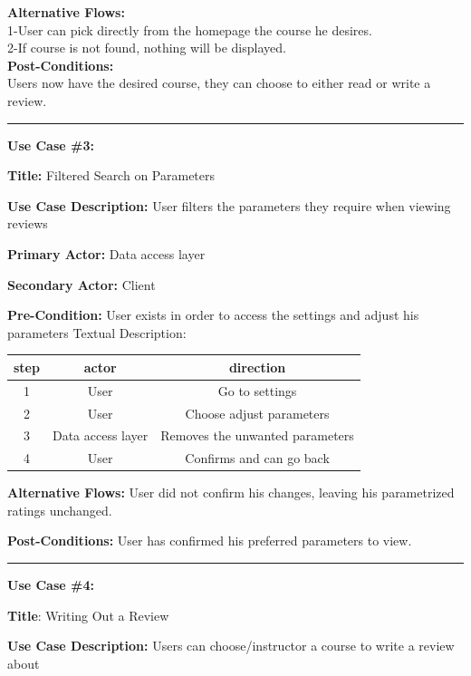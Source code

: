 \documentclass{article}
\begin{document}
\textbf{Alternative Flows:}\\
	1-User can pick directly from the homepage the course he desires.\\
	2-If course is not found, nothing will be displayed.\\
\textbf{Post-Conditions:}\\
	Users now have the desired course, they can choose to either read or write a review.\\

\hrule 


\textbf{Use Case \#3: }

\quad \textbf{Title:} Filtered Search on Parameters

\quad\textbf{Use Case Description:} User filters the parameters they require when viewing reviews

\quad\textbf{Primary Actor:} Data access layer

\quad\textbf{Secondary Actor:} Client

\quad\textbf{Pre-Condition:} User exists in order to access the settings and adjust his parameters
	Textual Description:


\begin{center}
  \begin{tabular}{|c|c|c|} 
    \hline
    step & actor & direction \\  \hline

    1 & 
    User & 
    Go to settings  \\ 
    2 & 
    User & 
Choose adjust parameters \\
    3 & 
    Data access layer &
Removes the unwanted parameters \\
    4 &
    User  &
Confirms and can go back \\
 \hline



  \end{tabular}
\end{center}

\textbf{Alternative Flows:}
	User did not confirm his changes, leaving his parametrized ratings unchanged.

  \textbf{Post-Conditions: }
User has confirmed his preferred parameters to view. \\

\hrule 


\textbf{Use Case \#4: }

\quad\textbf{Title}: Writing Out a Review

\quad\textbf{Use Case Description:}  Users can choose/instructor a course to write a review about
\end{document}
